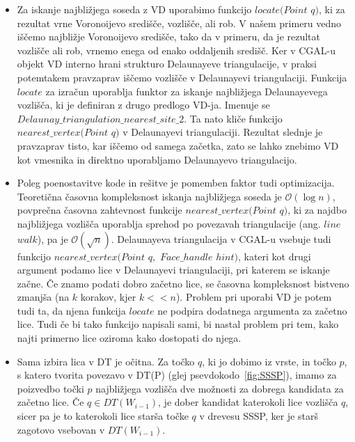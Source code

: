 \documentclass[a4paper, 12pt]{book}
\newcommand{\OO}{\ensuremath{\mathcal{O}}} %
\newcommand{\U}{\texttt{\_}}
\begin{document}
\begin{itemize}
\item Za iskanje najbližjega soseda z VD uporabimo funkcijo $locate(Point$ $q)$, ki za rezultat vrne Voronoijevo središče, vozlišče, ali rob. V našem primeru vedno iščemo najbližje Voronoijevo središče, tako da v primeru, da je rezultat vozlišče ali rob, vrnemo enega od enako oddaljenih središč. Ker v CGAL-u objekt VD interno hrani strukturo Delaunayeve triangulacije, v praksi potemtakem pravzaprav iščemo vozlišče v Delaunayevi triangulaciji. Funkcija $locate$ za izračun uporablja funktor za iskanje najbližjega Delaunayevega vozlišča, ki je definiran z drugo predlogo VD-ja. Imenuje se $Delaunay\U triangulation\U nearest\U site\U 2.$ Ta nato kliče funkcijo $nearest\U vertex(Point$ $q)$ v Delaunayevi triangulaciji. Rezultat slednje je pravzaprav tisto, kar iščemo od samega začetka, zato se lahko znebimo VD kot vmesnika in direktno uporabljamo Delaunayevo triangulacijo. 
\item Poleg poenostavitve kode in rešitve je pomemben faktor tudi optimizacija. Teoretična časovna kompleksnost iskanja najbližjega soseda je $\OO(\log n)$, povprečna časovna zahtevnost funkcije $nearest\U vertex(Point$ $q)$, ki za najdbo najbližjega vozlišča uporablja sprehod po povezavah triangulacije (ang. $line$ $walk$), pa je $\OO(\sqrt{n})$. Delaunayeva triangulacija v CGAL-u vsebuje tudi funkcijo $nearest\U vertex(Point$ $q,$ $Face\U handle$ $hint)$, kateri kot drugi argument podamo lice v Delaunayevi triangulaciji, pri katerem se iskanje začne. Če znamo podati dobro začetno lice, se časovna kompleksnost bistveno zmanjša (na $k$ korakov, kjer $k << n$). Problem pri uporabi VD je potem tudi ta, da njena funkcija $locate$ ne podpira dodatnega argumenta za začetno lice. Tudi če bi tako funkcijo napisali sami, bi nastal problem pri tem, kako najti primerno lice oziroma kako dostopati do njega. 
\item Sama izbira lica v DT je očitna. Za točko $q$, ki jo dobimo iz vrste, in točko $p$, s katero tvorita povezavo v DT(P) (glej psevdokodo~\ref{fig:SSSP}), imamo za poizvedbo točki $p$ najbližjega vozlišča dve možnosti za dobrega kandidata za začetno lice. Če $q\in DT(W_{i-1})$, je dober kandidat katerokoli lice vozlišča $q$, sicer pa je to katerokoli lice starša točke $q$ v drevesu SSSP, ker je starš zagotovo vsebovan v $DT(W_{i-1})$. 
\end{itemize}
\end{document}
